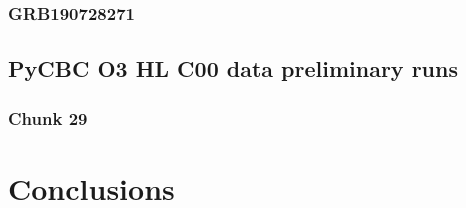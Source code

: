 \documentclass[binding=0.6cm, LaM]{sapthesis}
\begin{document}
\subsection{GRB190728271}

\section{PyCBC O3 HL C00 data preliminary runs}

\subsection{Chunk 29}

\chapter{Conclusions}

\backmatter
\cleardoublepage

\end{document}
